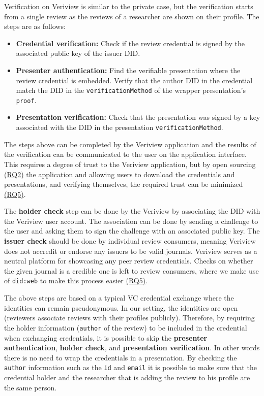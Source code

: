Verification on Veriview is similar to the private case, but the verification starts from a single review as the reviews of a researcher are shown on their profile. The steps are as follows:

\begin{itemize}

    \item \textbf{Credential verification:} Check if the review credential is signed by the associated public key of the issuer \acrshort{DID}.
    
    \item \textbf{Presenter authentication:} Find the verifiable presentation where the review credential is embedded. Verify that the author \acrshort{DID} in the credential match the \acrshort{DID} in the \lstinline{verificationMethod} of the wrapper presentation's \lstinline{proof}.
    
    \item \textbf{Presentation verification:} Check that the presentation was signed by a key associated with the \acrshort{DID} in the presentation \lstinline{verificationMethod}.

\end{itemize}

The steps above can be completed by the Veriview application and the results of the verification can be communicated to the user on the application interface. This requires a degree of trust to the Veriview application, but by open sourcing \hyperref[rq:transparent]{(RQ2)} the application and allowing users to download the credentials and presentations, and verifying themselves, the required trust can be minimized \hyperref[rq:direct-trust]{(RQ5)}. 

The \textbf{holder check} step can be done by the Veriview by associating the \acrshort{DID} with the Veriview user account. The association can be done by sending a challenge to the user and asking them to sign the challenge with an associated public key. The \textbf{issuer check} should be done by individual review consumers, meaning Veriview does not accredit or endorse any issuers to be valid journals. Veriview serves as a neutral platform for showcasing any peer review credentials. Checks on whether the given journal is a credible one is left to review consumers, where we make use of \lstinline{did:web} to make this process easier \hyperref[rq:direct-trust]{(RQ5)}.

The above steps are based on a typical \acrlong{VC} credential exchange where the identities can remain pseudonymous. In our setting, the identities are open (reviewers associate reviews with their profiles publicly). Therefore, by requiring the holder information (\lstinline{author} of the review) to be included in the credential when exchanging credentials, it is possible to skip the \textbf{presenter authentication}, \textbf{holder check}, and \textbf{presentation verification}. In other words there is no need to wrap the credentials in a presentation. By checking the \lstinline{author} information such as the \lstinline{id} and \lstinline{email} it is possible to make sure that the credential holder and the researcher that is adding the review to his profile are the same person.

